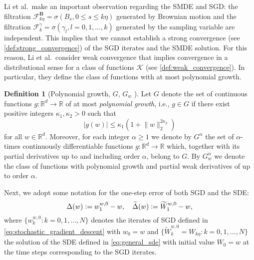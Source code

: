 \documentclass[12pt]{article}
\theoremstyle{definition}
\newtheorem{definition}[definition]{Definition}
\numberwithin{equation}{section}
\newcommand{\R}{\mathbb{R}}
\newcommand{\CF}{\mathcal{F}}
\newcommand{\norm}[1]{\lVert{#1}\rVert_2}
\newcommand{\defeq}{\vcentcolon=}
\begin{document}
Li et al.\ make an important observation regarding the SMDE and SGD: the filtration $\CF^{\mathbf{B}}_{k\eta} = \sigma(B_s, 0 \leq s \leq k \eta)$ generated by Brownian motion and the filtration $\CF^\gamma_k = \sigma(\gamma_l, l = 0,1,\dots, k)$ generated by the sampling variable are independent. This implies that we cannot establish a strong convergence (see \autoref{def:strong_convergence}) of the SGD iterates and the SMDE solution. For this reason, Li et al.\ consider weak convergence that implies convergence in a distributional sense for a class of functions $\mathcal{K}$ (see \autoref{def:weak_convergence}). In particular, they define the class of functions with at most polynomial growth.
\begin{definition}[Polynomial growth, $G$, $G_w$ ]
  Let $G$ denote the set of continuous functions $g : \R^d \rightarrow \R$ of at most \emph{polynomial growth}, i.e., $g \in G$ if there exist positive integers $\kappa_1, \kappa_2 > 0$ such that
  \begin{equation*}
    |g(w)| \leq \kappa_1(1 + \norm{w}^{2\kappa_2})
  \end{equation*} 
  for all $w \in \R^d$. Moreover, for each integer $\alpha \geq 1$ we denote by $G^{\alpha}$ the set of $\alpha$-times continuously differentiable functions $g : \R^d \rightarrow \R$ which, together with its partial derivatives up to and including order $\alpha$, belong to $G$. By $G^{\alpha}_w$ we denote the class of functions with polynomial growth and partial weak derivatives of up to order $\alpha$. 
\end{definition}
Next, we adopt some notation for the one-step error of both SGD and the SDE:
\begin{equation}
  \label{eq:one_step_error}
  \Delta(w) \defeq w_{1}^{w,0} - w, \quad \widetilde{\Delta}(w) \defeq \widetilde{W}^{w,0}_1 - w,
\end{equation}
where $\{w_k^{w,0}: k = 0,1,\dots, N\}$ denotes the iterates of SGD defined in \eqref{eq:stochastic_gradient_descent} with $w_0 = w$ and $\{\widetilde{W}_k^{w,0} = W_{k\eta}: k = 0,1,\dots, N\}$ the solution of the SDE defined in \eqref{eq:general_sde} with initial value $W_0 = w$ at the time steps corresponding to the SGD iterates.
\end{document}
